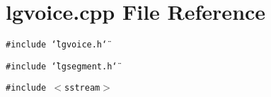 \section{lgvoice.cpp File Reference}
\label{lgvoice_8cpp}
{\tt \#include \char`\"{}lgvoice.h\char`\"{}}\par
{\tt \#include \char`\"{}lgsegment.h\char`\"{}}\par
{\tt \#include $<$sstream$>$}\par
